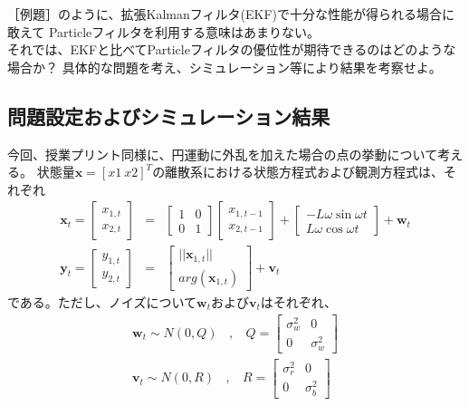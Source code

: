 \begin{screen}
  ［例題］のように、拡張Kalmanフィルタ(EKF)で十分な性能が得られる場合に敢えて
  Particleフィルタを利用する意味はあまりない。\\
  それでは、EKFと比べてParticleフィルタの優位性が期待できるのはどのような場合か？
  具体的な問題を考え、シミュレーション等により結果を考察せよ。
\end{screen}

\subsection{問題設定およびシミュレーション結果}
今回、授業プリント同様に、円運動に外乱を加えた場合の点の挙動について考える。
状態量$\bm{x}=[x1 \ x2]^T $の離散系における状態方程式および観測方程式は、それぞれ
\begin{eqnarray}
  \bm{x}_{t} =\left[\begin{array}{c}
    x_{1,t} \\ x_{2,t}
  \end{array}\right]
  &=&\left[\begin{array}{cc}
    1&0\\0&1
  \end{array}\right]
  \left[\begin{array}{c}
    x_{1,t-1}\\x_{2,t-1}
  \end{array}\right]
  + \left[\begin{array}{c}
    -L\omega\sin\omega t\\
    L\omega\cos\omega t
  \end{array}\right]
  + \bm{w}_t\\
  \bm{y}_t =\left[\begin{array}{c}
    y_{1,t}\\y_{2,t}
  \end{array}\right]
  &=& \left[\begin{array}{c}
    ||\bm{x}_{1,t}||\\
    arg(\bm{x}_{1,t})
  \end{array}\right]
  + \bm{v}_t
\end{eqnarray}
である。ただし、ノイズについて$\bm{w}_t$および$\bm{v}_t$はそれぞれ、
\begin{eqnarray}
  \bm{w}_t \sim N(0,Q)  ~~~~,~~~~ Q=\left[\begin{array}{cc}
    \sigma_w^2 & 0\\0 & \sigma_w^2
  \end{array}\right]\\
  \bm{v}_t \sim N(0,R) ~~~~,~~~~ R=\left[\begin{array}{cc}
    \sigma_r^2 & 0\\ 0 & \sigma_b^2
  \end{array}\right]
\end{eqnarray}
